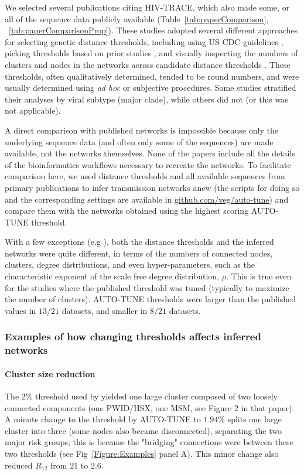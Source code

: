 \documentclass[utf8]{FrontiersinHarvard} %
\begin{document}
We selected several publications citing HIV-TRACE, which also made some, or all
of the sequence data publicly available (Table~\ref{tab:paperComparison},
~\ref{tab:paperComparisonProp}). These studies adopted several different
approaches for selecting genetic distance thresholds, including using US CDC
guidelines \citep{yan_central_2020}, picking thresholds based on prior studies
\citep{sivay_hiv-1_2018}, and visually inspecting the numbers of clusters and
nodes in the networks across candidate distance thresholds
\citep{liu_dynamics_2020}. These thresholds, often qualitatively determined,
tended to be round numbers, and were usually determined using {\it ad hoc} or
subjective procedures. Some studies stratified their analyses by viral subtype
(major clade), while others did not (or this was not applicable).

A direct comparison with published networks is impossible because only the
underlying sequence data (and often only some of the sequences) are made
available, not the networks themselves. None of the papers include all the
details of the bioinformatics workflows necessary to recreate the networks. To
facilitate comparison here, we used distance thresholds and all available
sequences from primary publications to infer transmission networks anew (the
scripts for doing so and the corresponding settings are available in
\url{github.com/veg/auto-tune}) and compare them with the networks obtained
using the highest scoring AUTO-TUNE threshold.

With a few exceptions (e.g \cite{dalai_combining_2018,sivay_hiv-1_2018}), both
the distance thresholds and the inferred networks were quite different, in
terms of the numbers of connected nodes, clusters, degree distributions, and
even hyper-parameters, such as the characteristic exponent of the scale free
degree distribution, $\rho$. This is true even for the studies where the
published threshold was tuned (typically to maximize the number of clusters).
AUTO-TUNE thresholds were larger than the published values in $13/21$ datasets,
and smaller in $8/21$ datasets.

\subsubsection{Examples of how changing thresholds affects inferred networks}

\paragraph{Cluster size reduction} The $2\%$ threshold used by \citet{dalai_combining_2018} yielded one large
cluster composed of two loosely connected components (one PWID/HSX, one MSM,
see Figure 2 in that paper). A minute change to the threshold by AUTO-TUNE to
$1.94\%$ splits one large cluster into three (some nodes also became
disconnected), separating the two major risk groups; this is because the
"bridging" connections were between these two thresholds (see
Fig~\ref{Figure:Examples} panel A). This minor change also reduced $R_{12}$
from $21$ to $2.6$.
\end{document}
